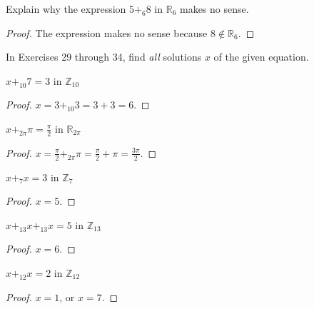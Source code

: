 \begin{exercise}
    Explain why the expression $5 {+}_{6} 8$ in $\mathbb{R}_{6}$ makes no sense.
\end{exercise}

\begin{proof}
    The expression makes no sense because $8\notin \mathbb{R}_{6}$.
\end{proof}

In Exercises 29 through 34, find \textit{all} solutions $x$ of the given equation.

\begin{exercise}
    $x {+}_{10} 7 = 3$ in $\mathbb{Z}_{10}$
\end{exercise}

\begin{proof}
    $x = 3 {+}_{10} 3 = 3 + 3 = 6$.
\end{proof}

\begin{exercise}
    $x {+}_{2\pi} \pi = \frac{\pi}{2}$ in $\mathbb{R}_{2\pi}$
\end{exercise}

\begin{proof}
    $x = \frac{\pi}{2} {+}_{2\pi} \pi = \frac{\pi}{2} + \pi = \frac{3\pi}{2}$.
\end{proof}

\begin{exercise}
    $x {+}_{7} x = 3$ in $\mathbb{Z}_{7}$
\end{exercise}

\begin{proof}
    $x = 5$.
\end{proof}

\begin{exercise}
    $x {+}_{13} x {+}_{13} x = 5$ in $\mathbb{Z}_{13}$
\end{exercise}

\begin{proof}
    $x = 6$.
\end{proof}

\begin{exercise}
    $x {+}_{12} x = 2$ in $\mathbb{Z}_{12}$
\end{exercise}

\begin{proof}
    $x = 1$, or $x = 7$.
\end{proof}

